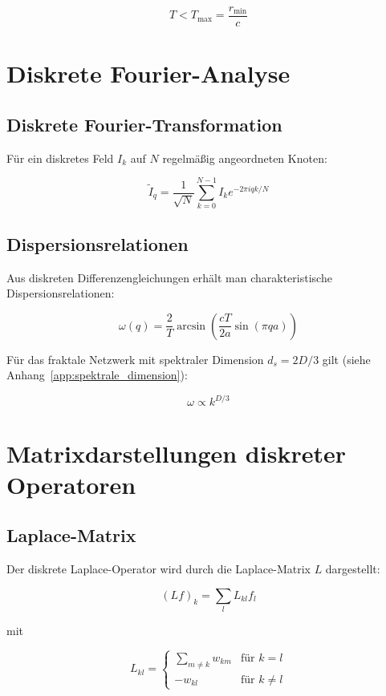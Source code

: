 \[
T < T_{\text{max}} = \frac{r_{\text{min}}}{c}
\]

\section{Diskrete Fourier-Analyse}
\label{app:mathematik_fourier}

\subsection{Diskrete Fourier-Transformation}
\label{sub:mathematik_fourier_trans}

Für ein diskretes Feld \( I_k \) auf \( N \) regelmäßig angeordneten Knoten:

\[
\tilde{I}_q = \frac{1}{\sqrt{N}} \sum_{k=0}^{N-1} I_k e^{-2\pi i q k / N}
\]

\subsection{Dispersionsrelationen}
\label{sub:mathematik_dispersion}

Aus diskreten Differenzengleichungen erhält man charakteristische Dispersionsrelationen:

\[
\omega(q) = \frac{2}{T} \arcsin \left( \frac{cT}{2a} \sin(\pi q a) \right)
\]

Für das fraktale Netzwerk mit spektraler Dimension \( d_s = 2D/3 \) gilt (siehe Anhang~\ref{app:spektrale_dimension}):

\[
\omega \propto k^{D/3}
\]

\section{Matrixdarstellungen diskreter Operatoren}
\label{app:mathematik_matrix}

\subsection{Laplace-Matrix}
\label{sub:mathematik_laplace}

Der diskrete Laplace-Operator wird durch die Laplace-Matrix \( L \) dargestellt:

\[
(Lf)_k = \sum_l L_{kl} f_l
\]

mit

\[
L_{kl} = \begin{cases}
\sum_{m \neq k} w_{km} & \text{für } k = l \\
-w_{kl} & \text{für } k \neq l
\end{cases}
\]

